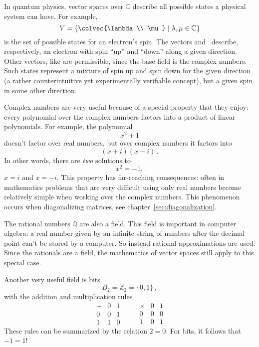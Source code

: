 \begin{example}
In quantum physics, vector spaces over $\mathbb{C}$ describe all possible states a physical system %
can have.  
For example,
\[
V= \left\{ \colvec{\lambda \\ \mu} \mid \lambda, \mu \in \mathbb{C}\right\}
\]
is the set of possible states for an electron's spin. The vectors   and~ describe, respectively,  an  electron with spin ``up'' and ``down'' along a given direction.  
Other vectors, like  are permissible, since the base field is the complex numbers. Such states represent a mixture of spin up and spin down for the given direction (a rather counterintuitive yet experimentally verifiable concept), but a given spin in some other direction.
\end{example}

Complex numbers are very useful because of a special property that they enjoy: every polynomial over the complex numbers factors into a product of linear polynomials.  For example, the polynomial \[x^2+1\] doesn't factor over  real numbers, but over complex numbers it factors into \[(x+i)(x-i)\, .\] In other words, there are {\itshape two} solutions to \[x^2=-1,\]
$x=i$ and $x=-i$.
 This property  has far-reaching consequences: often in mathematics problems that are very difficult using only real numbers become relatively simple when working over the complex numbers.  This phenomenon occurs when diagonalizing matrices, see chapter~\ref{sec:diagonalization}.

The rational numbers $\mathbb{Q}$ are also a field. This  field is important in computer algebra: a real number given by an infinite string of numbers after the decimal point can't be stored by a computer.  So instead rational approximations are used.  Since the rationals are a field, the mathematics of vector spaces still apply to this special case.

Another very useful field is bits 
\[
B_2={\mathbb Z}_2=\{0,1\}\, ,
\]
with the addition and multiplication rules
\[
\begin{array}{c|cc}
+&0&1\\\hline
0&0&1\\
1&1&0
\end{array}\qquad
\begin{array}{c|cc}
\times&0&1\\\hline
0&0&0\\
1&0&1
\end{array}
\]
These rules can be summarized by the relation $2=0$. For bits, it follows that $-1=1$!

